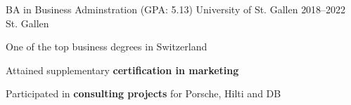 \begin{cventries}
	\cventry
	{BA in Business Adminstration (GPA: 5.13)} %
	{University of St. Gallen} %
	{2018--2022} %
	{St. Gallen} %
	{
		\begin{cvitems} %
			\item {One of the top business degrees in Switzerland}
			\item {Attained supplementary \textbf{certification in marketing}}
			\item {Participated in \textbf{consulting projects} for Porsche, Hilti and DB}
		\end{cvitems}
	}
	{}



\end{cventries}
